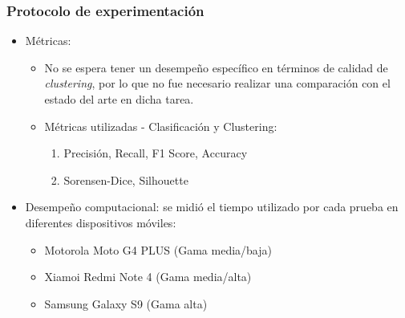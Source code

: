 \begin{frame}[t,fragile]
\frametitle {Protocolo de experimentación}
\begin{itemize}
	\item Métricas:
	\begin{itemize}
		\item No se espera tener un desempeño específico en términos de calidad de \textit{clustering}, por lo que no fue necesario realizar una comparación con el estado del arte en dicha tarea.
		\vspace{2mm}
		\item Métricas utilizadas - \color{red} Clasificación \color{black}y \color{blue} Clustering:
		\vspace{2mm}
		\begin{enumerate}
			\item \color{red} Precisión, Recall, F1 Score, Accuracy
			\item \color{blue} Sorensen-Dice, Silhouette 
		\end{enumerate}
	\end{itemize}
	\vspace{3mm}
	\item Desempeño computacional: se midió el tiempo utilizado por cada prueba en diferentes dispositivos móviles:
	\begin{itemize}
		\item Motorola Moto G4 PLUS (Gama media/baja)
		\vspace{2mm}
		\item Xiamoi Redmi Note 4 (Gama media/alta)
		\vspace{2mm}
		\item Samsung Galaxy S9 (Gama alta)
	\end{itemize}
\end{itemize}
\end{frame}
